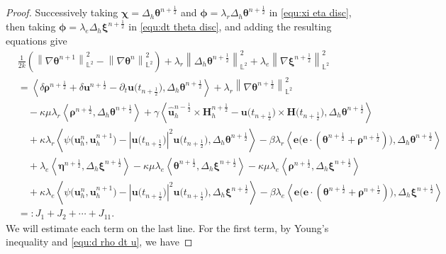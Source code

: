\documentclass[11pt, reqno]{amsart}
\theoremstyle{definition}
\theoremstyle{remark}
\numberwithin{equation}{section}
\newcommand{\bff}{\boldsymbol}
\newcommand{\bb}{\mathbb}
\newcommand{\norm}[2]{\left\|{#1}\right\|_{#2}}
\newcommand{\inpro}[2]{\left\langle#1,#2\right\rangle}
\newcommand{\abs}[1]{\left|{#1}\right|}
\begin{document}
\begin{proof}
Successively taking $\bff{\chi}=\Delta_h \bff{\theta}^{n+\frac{1}{2}}$ and $\bff{\phi}= \lambda_r \Delta_h \bff{\theta}^{n+\frac{1}{2}}$ in \eqref{equ:xi eta disc}, then taking $\bff{\phi}=\lambda_e \Delta_h \bff{\xi}^{n+\frac{1}{2}}$ in \eqref{equ:dt theta disc}, and adding the resulting equations give
\begin{align*}
	\nonumber
	&\frac{1}{2k} \left(\norm{\nabla \bff{\theta}^{n+1}}{\bb{L}^2}^2 - \norm{\nabla \bff{\theta}^n}{\bb{L}^2}^2 \right) 
	+
	\lambda_r \norm{\Delta_h \bff{\theta}^{n+\frac{1}{2}}}{\bb{L}^2}^2
	+
	\lambda_e \norm{\nabla \bff{\xi}^{n+\frac{1}{2}}}{\bb{L}^2}^2
	\\
	\nonumber
	&=
	\inpro{\delta \bff{\rho}^{n+\frac{1}{2}}+\delta \bff{u}^{n+\frac{1}{2}}- \partial_t \bff{u}\big(t_{n+\frac{1}{2}}\big)}{\Delta_h \bff{\theta}^{n+\frac{1}{2}}}
	+
	\lambda_r \norm{\nabla \bff{\theta}^{n+\frac{1}{2}}}{\bb{L}^2}^2
	\\
	\nonumber
	&\quad 
	-
	\kappa\mu \lambda_r \inpro{\bff{\rho}^{n+\frac{1}{2}}}{\Delta_h \bff{\theta}^{n+\frac{1}{2}}}
	+
	\gamma \inpro{\widehat{\bff{u}}_h^{n-\frac{1}{2}}\times \bff{H}_h^{n+\frac{1}{2}}- \bff{u}\big(t_{n+\frac{1}{2}}\big)\times \bff{H}\big(t_{n+\frac{1}{2}}\big)}{\Delta_h \bff{\theta}^{n+\frac{1}{2}}}
	\\
	\nonumber
	&\quad
	+
	\kappa \lambda_r \inpro{\psi\big(\bff{u}_h^n,\bff{u}_h^{n+1}\big) - \abs{\bff{u}\big(t_{n+\frac{1}{2}}\big)}^2 \bff{u}\big(t_{n+\frac{1}{2}}\big)}{\Delta_h \bff{\theta}^{n+\frac{1}{2}}}
	-
	\beta\lambda_r \inpro{\bff{e}\big(\bff{e}\cdot (\bff{\theta}^{n+\frac12}+\bff{\rho}^{n+\frac12})\big)}{\Delta_h \bff{\theta}^{n+\frac12}}
	\\
	\nonumber
	&\quad 
	+
	\lambda_e \inpro{\bff{\eta}^{n+\frac{1}{2}}}{\Delta_h \bff{\xi}^{n+\frac{1}{2}}}
	-
	\kappa \mu\lambda_e \inpro{\bff{\theta}^{n+\frac{1}{2}}}{\Delta_h \bff{\xi}^{n+\frac{1}{2}}}
	-
	\kappa\mu \lambda_e \inpro{\bff{\rho}^{n+\frac{1}{2}}}{\Delta_h \bff{\xi}^{n+\frac{1}{2}}}
	\\
	\nonumber
	&\quad 
	+
	\kappa \lambda_e \inpro{\psi\big(\bff{u}_h^n,\bff{u}_h^{n+1}\big) - \abs{\bff{u}\big(t_{n+\frac{1}{2}}\big)}^2 \bff{u}\big(t_{n+\frac{1}{2}}\big)}{\Delta_h \bff{\xi}^{n+\frac{1}{2}}}
	-
	\beta\lambda_e \inpro{\bff{e}\big(\bff{e}\cdot (\bff{\theta}^{n+\frac12}+\bff{\rho}^{n+\frac12})\big)}{\Delta_h \bff{\xi}^{n+\frac12}}
	\\
	&=: J_1+J_2+\cdots + J_{11}.
\end{align*}
We will estimate each term on the last line. For the first term, by Young's inequality and \eqref{equ:d rho dt u}, we have

\end{proof}
\end{document}
